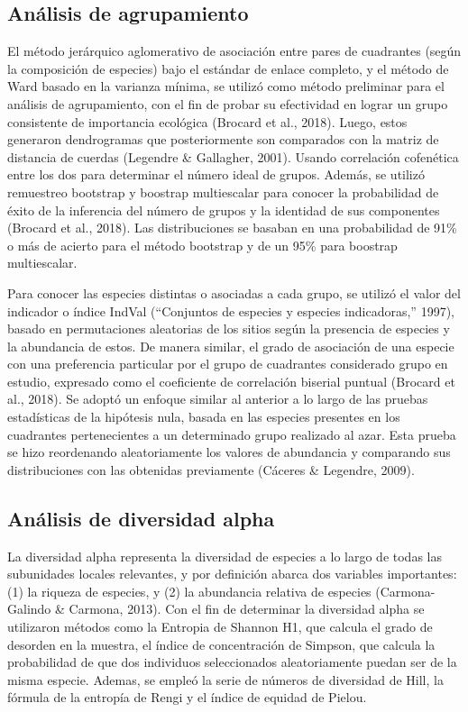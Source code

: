 \documentclass[11pt,]{article}
\begin{document}
\subsection{Análisis de agrupamiento}\label{anuxe1lisis-de-agrupamiento}

El método jerárquico aglomerativo de asociación entre pares de
cuadrantes (según la composición de especies) bajo el estándar de enlace
completo, y el método de Ward basado en la varianza mínima, se utilizó
como método preliminar para el análisis de agrupamiento, con el fin de
probar su efectividad en lograr un grupo consistente de importancia
ecológica (Brocard et al., 2018). Luego, estos generaron dendrogramas
que posteriormente son comparados con la matriz de distancia de cuerdas
(Legendre \& Gallagher, 2001). Usando correlación cofenética entre los
dos para determinar el número ideal de grupos. Además, se utilizó
remuestreo bootstrap y boostrap multiescalar para conocer la
probabilidad de éxito de la inferencia del número de grupos y la
identidad de sus componentes (Brocard et al., 2018). Las distribuciones
se basaban en una probabilidad de 91\% o más de acierto para el método
bootstrap y de un 95\% para boostrap multiescalar.

Para conocer las especies distintas o asociadas a cada grupo, se utilizó
el valor del indicador o índice IndVal (``Conjuntos de especies y
especies indicadoras,'' 1997), basado en permutaciones aleatorias de los
sitios según la presencia de especies y la abundancia de estos. De
manera similar, el grado de asociación de una especie con una
preferencia particular por el grupo de cuadrantes considerado grupo en
estudio, expresado como el coeficiente de correlación biserial puntual
(Brocard et al., 2018). Se adoptó un enfoque similar al anterior a lo
largo de las pruebas estadísticas de la hipótesis nula, basada en las
especies presentes en los cuadrantes pertenecientes a un determinado
grupo realizado al azar. Esta prueba se hizo reordenando aleatoriamente
los valores de abundancia y comparando sus distribuciones con las
obtenidas previamente (Cáceres \& Legendre, 2009).

\subsection{Análisis de diversidad
alpha}\label{anuxe1lisis-de-diversidad-alpha}

La diversidad alpha representa la diversidad de especies a lo largo de
todas las subunidades locales relevantes, y por definición abarca dos
variables importantes: (1) la riqueza de especies, y (2) la abundancia
relativa de especies (Carmona-Galindo \& Carmona, 2013). Con el fin de
determinar la diversidad alpha se utilizaron métodos como la Entropia de
Shannon H1, que calcula el grado de desorden en la muestra, el índice de
concentración de Simpson, que calcula la probabilidad de que dos
individuos seleccionados aleatoriamente puedan ser de la misma especie.
Ademas, se empleó la serie de números de diversidad de Hill, la fórmula
de la entropía de Rengi y el índice de equidad de Pielou.
\end{document}
